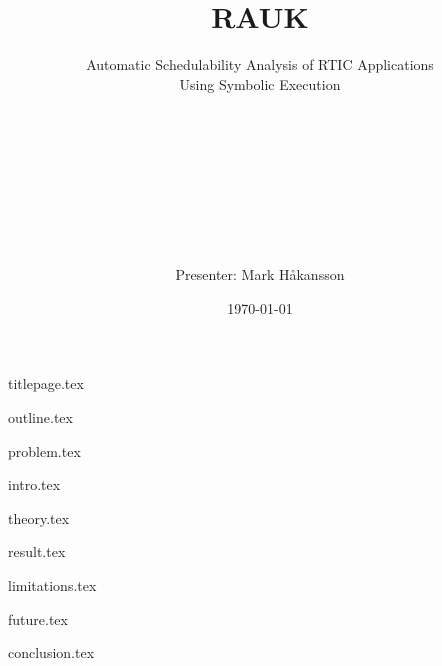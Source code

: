 \documentclass[10pt]{beamer}
\title[RAUK]{
    \hspace{1cm} \\
    \Huge RAUK}
\subtitle{
    Automatic Schedulability Analysis of RTIC Applications \\
    Using Symbolic Execution}
\author{
    \hspace{1cm} \\
    \hspace{1cm} \\
    \hspace{1cm} \\
    \hspace{1cm} \\
    \hspace{1cm} \\
    \hspace{1cm} \\
    \hspace{1cm} \\
    \hspace{1cm} \\
    Presenter: Mark Håkansson}
\institute{
    \hspace{1cm} \\
    Supervisor: Prof. Per Lindgren \\
    Luleå University of Technology}
\date{\today}
\begin{document}
{titlepage.tex}

{outline.tex}

{problem.tex}

{intro.tex}

{theory.tex}

{result.tex}

{limitations.tex}

{future.tex}

{conclusion.tex}
\end{document}

